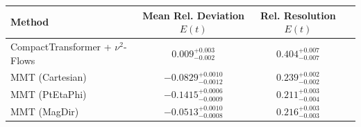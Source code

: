     \begin{tabular}{lccc}
        \toprule
        Method & Mean Rel. Deviation $E(t)$ & Rel. Resolution $E(t)$ \\
        \midrule
        CompactTransformer + $\nu^2$-Flows & $0.009^{+0.003}_{-0.002}$ & $0.404^{+0.007}_{-0.007}$ \\
        MMT (Cartesian) & $-0.0829^{+0.0010}_{-0.0012}$ & $0.239^{+0.002}_{-0.002}$ \\
        MMT (PtEtaPhi) & $-0.1415^{+0.0006}_{-0.0009}$ & $0.211^{+0.003}_{-0.004}$ \\
        MMT (MagDir) & $-0.0513^{+0.0010}_{-0.0008}$ & $0.216^{+0.003}_{-0.003}$ \\
        \bottomrule
    \end{tabular}
